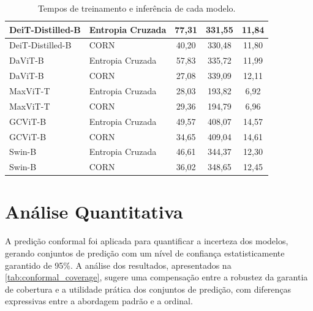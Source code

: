 \begin{table}
\begin{tabular}{|l|l|c|c|c|}
        \hline
        DeiT-Distilled-B & Entropia Cruzada & 77,31 & 331,55 & 11,84 \\
        \hline
        DeiT-Distilled-B & CORN & 40,20 & 330,48 & 11,80 \\
        \hline
        DaViT-B & Entropia Cruzada & 57,83 & 335,72 & 11,99 \\
        \hline
        DaViT-B & CORN & 27,08 & 339,09 & 12,11 \\
        \hline
        MaxViT-T & Entropia Cruzada & 28,03 & 193,82 & 6,92 \\
        \hline
        MaxViT-T & CORN & 29,36 & 194,79 & 6,96 \\
        \hline
        GCViT-B & Entropia Cruzada & 49,57 & 408,07 & 14,57 \\
        \hline
        GCViT-B & CORN & 34,65 & 409,04 & 14,61 \\
        \hline
        Swin-B & Entropia Cruzada & 46,61 & 344,37 & 12,30 \\
        \hline
        Swin-B & CORN & 36,02 & 348,65 & 12,45 \\
        \hline
    \end{tabular}
    \caption{Tempos de treinamento e inferência de cada modelo.}
    \label{tab:computational_performance}
\end{table}

\section{Análise Quantitativa}

A predição conformal foi aplicada para quantificar a incerteza dos modelos, gerando conjuntos de predição com um nível de confiança estatisticamente garantido de 95\%. A análise dos resultados, apresentados na \autoref{tab:conformal_coverage}, sugere uma compensação entre a robustez da garantia de cobertura e a utilidade prática dos conjuntos de predição, com diferenças expressivas entre a abordagem padrão e a ordinal.

